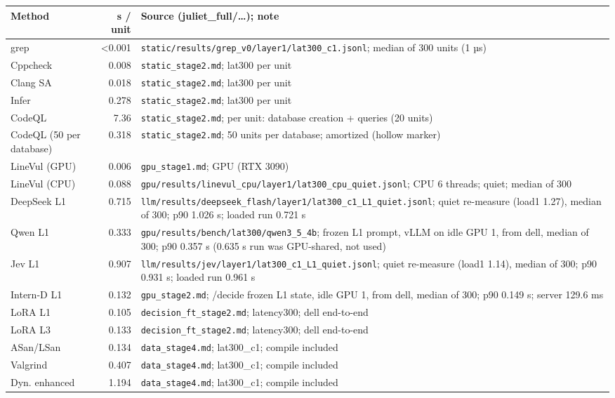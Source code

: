 \begin{tabular}{@{}lrl@{}}
\toprule
Method & s / unit & Source (juliet\_full/\ldots); note \\
\midrule
grep & <0.001 & \texttt{static/results/grep\_v0/layer1/lat300\_c1.jsonl}; median of 300 units (1 µs) \\
Cppcheck & 0.008 & \texttt{static\_stage2.md}; lat300 per unit \\
Clang SA & 0.018 & \texttt{static\_stage2.md}; lat300 per unit \\
Infer & 0.278 & \texttt{static\_stage2.md}; lat300 per unit \\
CodeQL & 7.36 & \texttt{static\_stage2.md}; per unit: database creation + queries (20 units) \\
CodeQL (50 per database) & 0.318 & \texttt{static\_stage2.md}; 50 units per database; amortized (hollow marker) \\
LineVul (GPU) & 0.006 & \texttt{gpu\_stage1.md}; GPU (RTX 3090) \\
LineVul (CPU) & 0.088 & \texttt{gpu/results/linevul\_cpu/layer1/lat300\_cpu\_quiet.jsonl}; CPU 6 threads; quiet; median of 300 \\
DeepSeek L1 & 0.715 & \texttt{llm/results/deepseek\_flash/layer1/lat300\_c1\_L1\_quiet.jsonl}; quiet re-measure (load1 1.27), median of 300; p90 1.026 s; loaded run 0.721 s \\
Qwen L1 & 0.333 & \texttt{gpu/results/bench/lat300/qwen3\_5\_4b}; frozen L1 prompt, vLLM on idle GPU 1, from dell, median of 300; p90 0.357 s (0.635 s run was GPU-shared, not used) \\
Jev L1 & 0.907 & \texttt{llm/results/jev/layer1/lat300\_c1\_L1\_quiet.jsonl}; quiet re-measure (load1 1.14), median of 300; p90 0.931 s; loaded run 0.961 s \\
Intern-D L1 & 0.132 & \texttt{gpu\_stage2.md}; /decide frozen L1 state, idle GPU 1, from dell, median of 300; p90 0.149 s; server 129.6 ms \\
LoRA L1 & 0.105 & \texttt{decision\_ft\_stage2.md}; latency300; dell end-to-end \\
LoRA L3 & 0.133 & \texttt{decision\_ft\_stage2.md}; latency300; dell end-to-end \\
ASan/LSan & 0.134 & \texttt{data\_stage4.md}; lat300\_c1; compile included \\
Valgrind & 0.407 & \texttt{data\_stage4.md}; lat300\_c1; compile included \\
Dyn. enhanced & 1.194 & \texttt{data\_stage4.md}; lat300\_c1; compile included \\
\bottomrule
\end{tabular}
